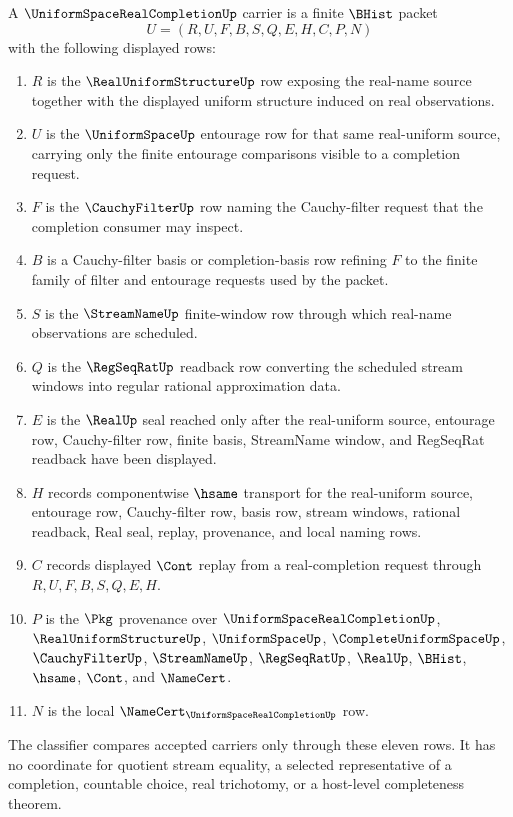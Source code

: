\begin{definition}
\label{def:uniform-space-real-completion-carrier}
A $\UniformSpaceRealCompletionUp$ carrier is a finite $\BHist$ packet
$$
U=(R,U,F,B,S,Q,E,H,C,P,N)
$$
with the following displayed rows:
\begin{enumerate}
\item $R$ is the $\RealUniformStructureUp$ row exposing the real-name source together with the displayed uniform structure induced on real observations.
\item $U$ is the $\UniformSpaceUp$ entourage row for that same real-uniform source, carrying only the finite entourage comparisons visible to a completion request.
\item $F$ is the $\CauchyFilterUp$ row naming the Cauchy-filter request that the completion consumer may inspect.
\item $B$ is a Cauchy-filter basis or completion-basis row refining $F$ to the finite family of filter and entourage requests used by the packet.
\item $S$ is the $\StreamNameUp$ finite-window row through which real-name observations are scheduled.
\item $Q$ is the $\RegSeqRatUp$ readback row converting the scheduled stream windows into regular rational approximation data.
\item $E$ is the $\RealUp$ seal reached only after the real-uniform source, entourage row, Cauchy-filter row, finite basis, StreamName window, and RegSeqRat readback have been displayed.
\item $H$ records componentwise $\hsame$ transport for the real-uniform source, entourage row, Cauchy-filter row, basis row, stream windows, rational readback, Real seal, replay, provenance, and local naming rows.
\item $C$ records displayed $\Cont$ replay from a real-completion request through $R,U,F,B,S,Q,E,H$.
\item $P$ is the $\Pkg$ provenance over $\UniformSpaceRealCompletionUp$, $\RealUniformStructureUp$, $\UniformSpaceUp$, $\CompleteUniformSpaceUp$, $\CauchyFilterUp$, $\StreamNameUp$, $\RegSeqRatUp$, $\RealUp$, $\BHist$, $\hsame$, $\Cont$, and $\NameCert$.
\item $N$ is the local $\NameCert_{\UniformSpaceRealCompletionUp}$ row.
\end{enumerate}
The classifier compares accepted carriers only through these eleven rows. It has no coordinate for quotient stream equality, a selected representative of a completion, countable choice, real trichotomy, or a host-level completeness theorem.
\end{definition}

